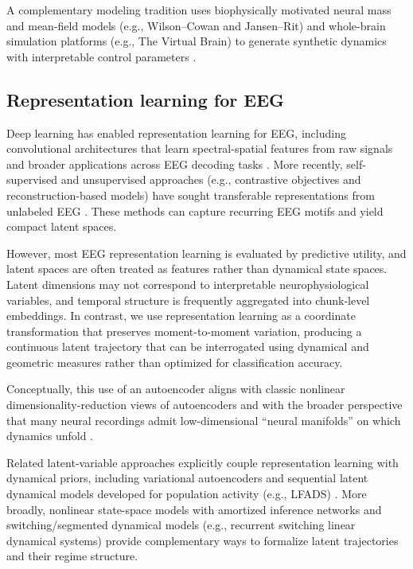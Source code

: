 \documentclass[5p,twocolumn,authoryear]{elsarticle}
\begin{document}
A complementary modeling tradition uses biophysically motivated neural mass and mean-field models (e.g., Wilson--Cowan and Jansen--Rit) and whole-brain simulation platforms (e.g., The Virtual Brain) to generate synthetic dynamics with interpretable control parameters \citep{WilsonCowan1972,JansenRit1995,SanzLeon2013}.

\subsection{Representation learning for EEG}

Deep learning has enabled representation learning for EEG, including convolutional architectures that learn spectral-spatial features from raw signals \citep{Schirrmeister2017} and broader applications across EEG decoding tasks \citep{Roy2019}. More recently, self-supervised and unsupervised approaches (e.g., contrastive objectives and reconstruction-based models) have sought transferable representations from unlabeled EEG \citep{Banville2021,Kostas2021}. These methods can capture recurring EEG motifs and yield compact latent spaces.

However, most EEG representation learning is evaluated by predictive utility, and latent spaces are often treated as features rather than dynamical state spaces. Latent dimensions may not correspond to interpretable neurophysiological variables, and temporal structure is frequently aggregated into chunk-level embeddings. In contrast, we use representation learning as a coordinate transformation that preserves moment-to-moment variation, producing a continuous latent trajectory that can be interrogated using dynamical and geometric measures rather than optimized for classification accuracy.

Conceptually, this use of an autoencoder aligns with classic nonlinear dimensionality-reduction views of autoencoders \citep{Hinton2006} and with the broader perspective that many neural recordings admit low-dimensional ``neural manifolds'' on which dynamics unfold \citep{CunninghamYu2014}.

Related latent-variable approaches explicitly couple representation learning with dynamical priors, including variational autoencoders \citep{KingmaWelling2014} and sequential latent dynamical models developed for population activity (e.g., LFADS) \citep{Pandarinath2018}. More broadly, nonlinear state-space models with amortized inference networks \citep{Krishnan2017Structured} and switching/segmented dynamical models (e.g., recurrent switching linear dynamical systems) \citep{Linderman2017rSLDS} provide complementary ways to formalize latent trajectories and their regime structure.
\end{document}
